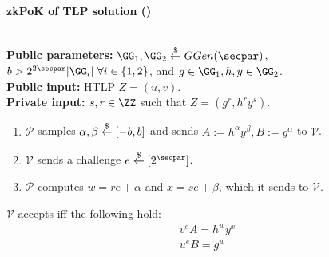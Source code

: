     \begin{mdframed}
    \begin{center}
        \textbf{zkPoK of TLP solution (\zkpoks)}
    \end{center}
    \hfill\\
    \textbf{Public parameters:} $\GG_1, \GG_2 \sample GGen(\secpar)$, $b > 2^{2\secpar}\sizeof{\GG_i}~\forall i \in \{1,2\}$, and $g \in \GG_1, h,y \in \GG_2$. \hfill\\
    \textbf{Public input:} HTLP $Z = (u,v)$. \hfill\\
    \textbf{Private input:} $s, r \in \ZZ$ such that $Z = (g^r, h^r y^s)$.
    \begin{enumerate}
        \item $\mathcal{P}$ samples $\alpha, \beta \stackrel{\$}{\gets} [-b,b]$ and sends $A := h^\alpha y^\beta, B := g^\alpha$ to $\mathcal{V}$.
        \item $\mathcal{V}$ sends a challenge $e \sample [2^\secpar]$. %
        \item $\mathcal{P}$ computes $w = r e + \alpha$ and $x = s e + \beta$,
        which it sends to $\mathcal{V}$.
    \end{enumerate}
    $\mathcal{V}$ accepts iff the following hold:
    \begin{align*}
        v^e A = h^w y^x \\
        u^e B = g^w
    \end{align*}
    \end{mdframed}
